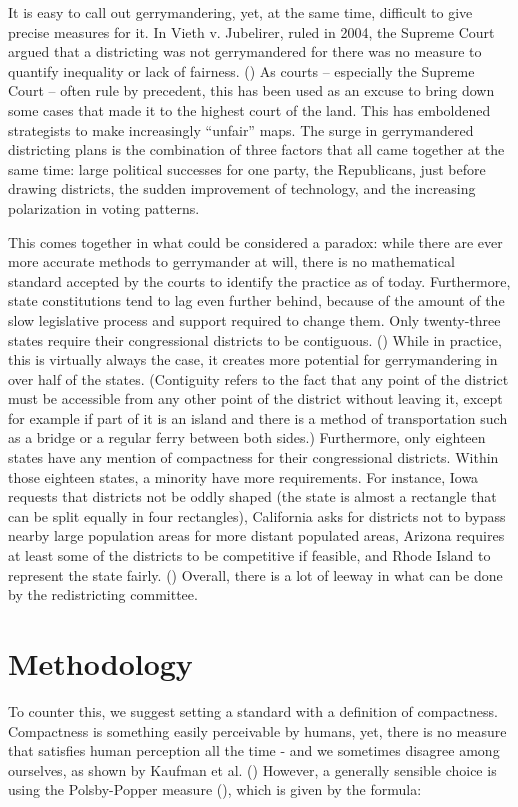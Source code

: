 \documentclass[letterpaper]{article}
\begin{document}
It is easy to call out gerrymandering, yet, at the same time, difficult to give precise measures for it. In Vieth v. Jubelirer, ruled in 2004, the Supreme Court argued that a districting was not gerrymandered for there was no measure to quantify inequality or lack of fairness. (\cite{vieth}) As courts – especially the Supreme Court – often rule by precedent, this has been used as an excuse to bring down some cases that made it to the highest court of the land. This has emboldened strategists to make increasingly “unfair” maps. The surge in gerrymandered districting plans is the combination of three factors that all came together at the same time: large political successes for one party, the Republicans, just before drawing districts, the sudden improvement of technology, and the increasing polarization in voting patterns.


This comes together in what could be considered a paradox: while there are ever more accurate methods to gerrymander at will, there is no mathematical standard accepted by the courts to identify the practice as of today. Furthermore, state constitutions tend to lag even further behind, because of the amount of the slow legislative process and support required to change them. Only twenty-three states require their congressional districts to be contiguous. (\cite{contiguity}) While in practice, this is virtually always the case, it creates more potential for gerrymandering in over half of the states. (Contiguity refers to the fact that any point of the district must be accessible from any other point of the district without leaving it, except for example if part of it is an island and there is a method of transportation such as a bridge or a regular ferry between both sides.) Furthermore, only eighteen states have any mention of compactness for their congressional districts. Within those eighteen states, a minority have more requirements. For instance, Iowa requests that districts not be oddly shaped (the state is almost a rectangle that can be split equally in four rectangles), California asks for districts not to bypass nearby large population areas for more distant populated areas, Arizona requires at least some of the districts to be competitive if feasible, and Rhode Island to represent the state fairly. (\cite{contiguity}) Overall, there is a lot of leeway in what can be done by the redistricting committee. 


\section{Methodology}
To counter this, we suggest setting a standard with a definition of compactness. Compactness is something easily perceivable by humans, yet, there is no measure that satisfies human perception all the time - and we sometimes disagree among ourselves, as shown by Kaufman et al. (\cite{king})
However, a generally sensible choice is using the Polsby-Popper measure (\cite{polsbypopper}), which is given by the formula:
\end{document}
